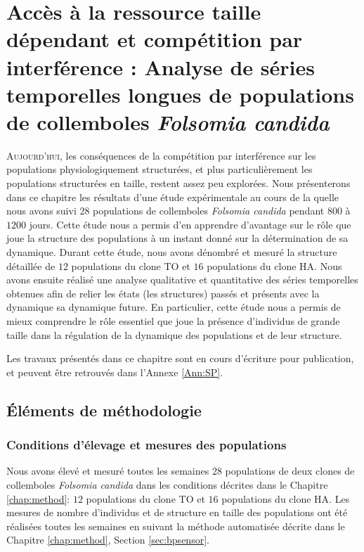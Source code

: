 \chapter{Accès à la ressource taille dépendant et compétition par interférence :
Analyse de séries temporelles longues de populations de collemboles \textit{Folsomia candida}}
\label{chap:sp}

\vspace{5cm}

\lettrine[lines=3]{A}{ujourd'hui}, les conséquences de la compétition par
interférence sur les populations physiologiquement structurées, et plus particulièrement les
populations structurées en taille, restent assez peu explorées. Nous
présenterons dans ce chapitre les résultats d'une étude expérimentale au cours
de la quelle nous avons suivi 28 populations de collemboles \textit{Folsomia
candida} pendant $800$ à $1200$ jours. Cette étude nous a permis d'en apprendre
d'avantage sur le rôle que joue la structure des populations à un instant donné
sur la détermination de sa dynamique. Durant cette étude, nous avons dénombré et
mesuré la structure détaillée de $12$ populations du clone TO et $16$
populations du clone HA. Nous avons ensuite réalisé une analyse qualitative et
quantitative des séries temporelles obtenues afin de relier les états (les
structures) passés et présents avec la dynamique sa dynamique future. En
particulier, cette étude nous a permis de mieux comprendre le rôle essentiel que
joue la présence d'individus de grande taille dans la régulation de la dynamique
des populations et de leur structure. 

Les travaux présentés dans ce chapitre sont en cours d'écriture pour
publication, et peuvent être retrouvés dans l'Annexe \ref{Ann:SP}.

\section{Éléments de méthodologie}

\subsection{Conditions d'élevage et mesures des populations}

Nous avons élevé et mesuré toutes les semaines 28 populations de deux clones de
collemboles \textit{Folsomia candida} dans les conditions décrites dans le
Chapitre \ref{chap:method}: $12$ populations du clone TO et $16$
populations du clone HA. Les mesures de nombre d'individus et de structure en
taille des populations ont été réalisées toutes les semaines en suivant la
méthode automatisée décrite dans le Chapitre \ref{chap:method}, Section \ref{sec:bpsensor}. 


